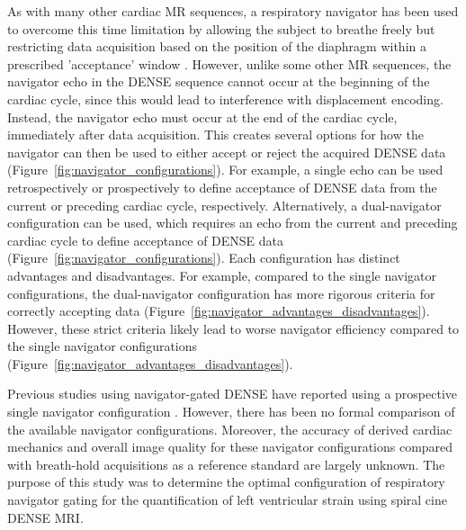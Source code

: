 	As with many other cardiac MR sequences, a respiratory navigator has been used to overcome this time limitation by allowing the subject to breathe freely but restricting data acquisition based on the position of the diaphragm within a prescribed 'acceptance' window \cite{Zhong2010a}. However, unlike some other MR sequences, the navigator echo in the DENSE sequence cannot occur at the beginning of the cardiac cycle, since this would lead to interference with displacement encoding. Instead, the navigator echo must occur at the end of the cardiac cycle, immediately after data acquisition. This creates several options for how the navigator can then be used to either accept or reject the acquired DENSE data (Figure~\ref{fig:navigator_configurations}). For example, a single echo can be used retrospectively or prospectively to define acceptance of DENSE data from the current or preceding cardiac cycle, respectively. Alternatively, a dual-navigator configuration can be used, which requires an echo from the current and preceding cardiac cycle to define acceptance of DENSE data (Figure~\ref{fig:navigator_configurations}). Each configuration has distinct advantages and disadvantages. For example, compared to the single navigator configurations, the dual-navigator configuration has more rigorous criteria for correctly accepting data (Figure~\ref{fig:navigator_advantages_disadvantages}). However, these strict criteria likely lead to worse navigator efficiency compared to the single navigator configurations (Figure~\ref{fig:navigator_advantages_disadvantages}).
	
	Previous studies using navigator-gated DENSE have reported using a prospective single navigator configuration \cite{Zhong2010a,Auger2012}. However, there has been no formal comparison of the available navigator configurations. Moreover, the accuracy of derived cardiac mechanics and overall image quality for these navigator configurations compared with breath-hold acquisitions as a reference standard are largely unknown. The purpose of this study was to determine the optimal configuration of respiratory navigator gating for the quantification of left ventricular strain using spiral cine DENSE MRI.


